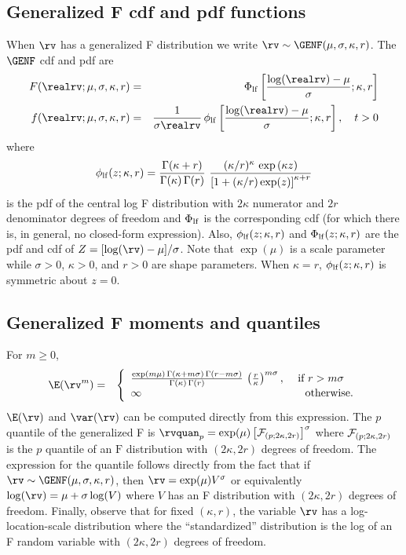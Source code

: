 \subsection{Generalized F cdf and pdf functions}
When $\rv$ has a  generalized F distribution
we write $\rv \sim \GENF(\mu,\sigma,\kappa,r)$. The $\GENF$ cdf and pdf are
\begin{eqnarray*}  
 F(\realrv;\mu, \sigma, \kappa,r)
&=&\Phi_{\rm lf}\left [\frac{\log(\realrv)-\mu}{\sigma}; \kappa,r
\right ]\\
 f(\realrv;\mu, \sigma, \kappa,r)&=&\frac{1}{ \sigma \realrv} \, 
\phi_{\rm lf}
\left [ 
\frac{\log(\realrv)-\mu}{\sigma}; \kappa,r \right], \quad t>0
\end{eqnarray*} 
where 
\begin{displaymath}
\phi_{\rm lf}(z;\kappa,r)=
\frac{\Gamma(\kappa+r)}{\Gamma(\kappa)\,\Gamma(r)}
\,\,
\frac{
 (\kappa/r)^{\kappa}
\,
\exp 
\left (
\kappa z
\right )
     } {
\left [
1+ (\kappa/r) \exp(z)
\right ]^{\kappa+r}
     }
\end{displaymath} 
is the pdf of the central log F distribution with $2\kappa$ numerator
and $2r$ denominator
degrees of freedom and $\Phi_{\rm lf}$ is the corresponding cdf
(for which there is, in general, no closed-form expression).  Also,
$\phi_{\rm lf}(z;\kappa,r)$ and $\Phi_{\rm lf}(z;\kappa,r)$ are the
pdf and cdf of $Z=[\log(\rv)-\mu]/\sigma$.  Note that $\exp(\mu)$ is a
scale parameter while $\sigma > 0$, $\kappa>0$, and $r>0$ are shape
parameters. When $\kappa=r$, $\phi_{\rm lf}(z;\kappa,r)$ is symmetric
about $z=0$.

\subsection{Generalized F moments and quantiles}

For $m \ge 0$,
\begin{eqnarray*}
\E(\rv^{m})&=&
\left \{
\begin{array}{ll}
\frac{
\exp(m \mu) 
\,
 \Gamma( \kappa + m \sigma) \, \Gamma( r-m \sigma)
     }
     {
 \Gamma( \kappa ) \, \Gamma( r)
     }
\,
 \left (
\frac{
     r
     }
     {
     \kappa
     }
\right )^{m \sigma},
& \,\, \mbox{if} \,\, r> m\sigma
\\
\infty & \quad \mbox{otherwise}.
\end{array}
\right.
\end{eqnarray*}
$\E(\rv)$ and $\var(\rv)$ can be computed directly from this expression.
The $p$ quantile of the generalized F is $\rvquan_{p}= \exp(\mu) \left
[{\cal F}_{(p; 2\kappa, 2r)}\right]^{\sigma}$ where 
${\cal F}_{(p; 2\kappa, 2r)}$ is
the $p$ quantile of an $\mbox{F}$ distribution with $(2\kappa,2r)$
degrees of freedom.  The expression for the quantile follows directly
from the fact that if $\rv \sim \GENF(\mu, \sigma, \kappa,r)$, then
$\rv= \exp(\mu) V^{\sigma}$ or equivalently $\log(\rv)=\mu+ \sigma
\log(V)$ where $V$ has an F distribution with $(2\kappa, 2r)$ degrees
of freedom.
Finally, observe that 
for fixed $(\kappa,r)$, the variable
$\rv$ has a log-location-scale distribution where 
the ``standardized'' distribution is the log of an F random variable
with $(2\kappa, 2r)$ degrees of freedom.

